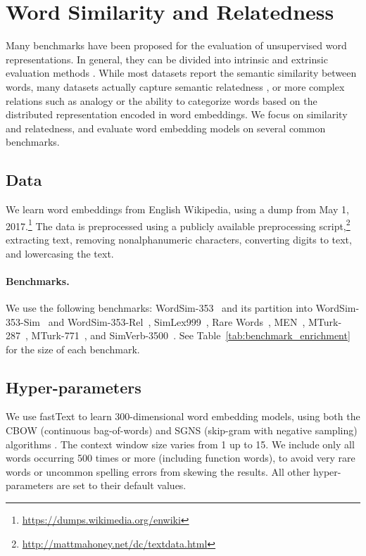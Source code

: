 \documentclass[11pt,a4paper]{article}
\begin{document}
    \section{Word Similarity and Relatedness}\label{sec:benchmarks}
    
    Many benchmarks have been proposed for the evaluation of unsupervised word
    representations.
    In general, they can be divided into intrinsic and extrinsic evaluation methods
    \cite{schnabel2015evaluation,chiu2016intrinsic,jastrzebski2017evaluate,alshargi2018concept2vec,bakarov2018survey}.
    While most datasets report the semantic similarity between words,
    many datasets actually capture semantic relatedness
    \cite{hill2015simlex,avraham2016improving},
    or more complex relations such as analogy or the ability to categorize
    words based on the distributed representation encoded in word embeddings.
    We focus on similarity and relatedness, and evaluate word embedding models
    on several common benchmarks.
    
    \subsection{Data}\label{sec:data}
    We learn word embeddings from English Wikipedia,
    using a dump from May 1, 2017.\footnote{\url{https://dumps.wikimedia.org/enwiki}}
    The data is preprocessed using a publicly available preprocessing
    script,\footnote{\url{http://mattmahoney.net/dc/textdata.html}}
    extracting text, removing nonalphanumeric characters,
    converting digits to text, and lowercasing the text.
    
    \paragraph{Benchmarks.}
    
    We use the following benchmarks:
     WordSim-353~\cite{finkelstein2001placing} and its partition into
     WordSim-353-Sim~\cite{agirre2009study} and
     WordSim-353-Rel~\cite{zesch2008using},
     SimLex999~\cite{hill2015simlex},
     Rare Words~\cite[RW; ][]{luong2013better},
     MEN~\cite{bruni2012distributional},
     MTurk-287~\cite{radinsky2011word},
     MTurk-771~\cite{halawi2012large}, and
     SimVerb-3500~\cite{Gerz2016emnlp}.
    See Table~\ref{tab:benchmark_enrichment} for the size of each benchmark.
    
    \subsection{Hyper-parameters}\label{sec:hyperparams}
    We use fastText \cite{bojanowski2016enriching} to learn
    300-dimensional word embedding models,
    using both the CBOW (continuous bag-of-words) and
    SGNS (skip-gram with negative sampling) algorithms \cite{mikolov2013efficient}.
    The context window size varies from 1 up to 15.
    We include only all words occurring 500 times or more
    (including function words), to avoid
    very rare words or uncommon spelling errors from skewing the results.
    All other hyper-parameters are set to their default values.
    
\end{document}
